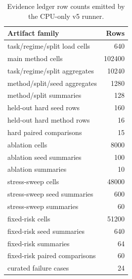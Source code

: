 \begin{table}[t]
\centering
\caption{Evidence ledger row counts emitted by the CPU-only v5 runner.}
\small
\begin{tabular}{lr}
\toprule
Artifact family & Rows \\
\midrule
task/regime/split load cells & 640 \\
main method cells & 102400 \\
task/regime/split aggregates & 10240 \\
method/split/seed aggregates & 1280 \\
method/split summaries & 128 \\
held-out hard seed rows & 160 \\
held-out hard method rows & 16 \\
hard paired comparisons & 15 \\
ablation cells & 8000 \\
ablation seed summaries & 100 \\
ablation summaries & 10 \\
stress-sweep cells & 48000 \\
stress-sweep seed summaries & 600 \\
stress-sweep summaries & 60 \\
fixed-risk cells & 51200 \\
fixed-risk seed summaries & 640 \\
fixed-risk summaries & 64 \\
fixed-risk paired comparisons & 60 \\
curated failure cases & 24 \\
\bottomrule
\end{tabular}
\end{table}

